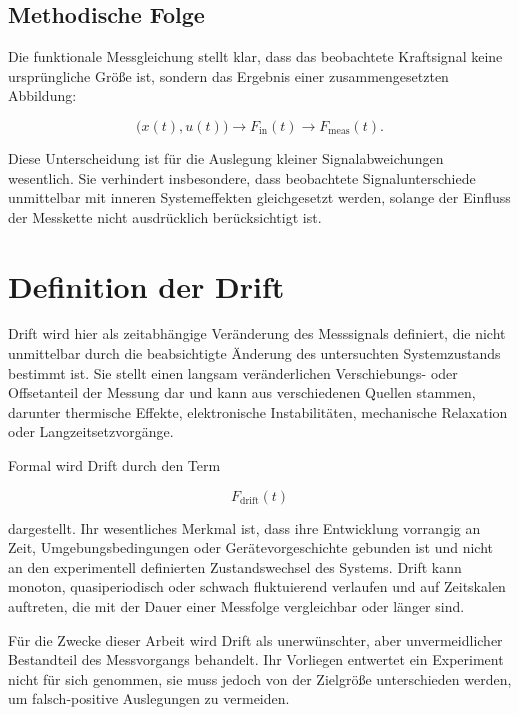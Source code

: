 \documentclass[12pt,a4paper]{report}
\begin{document}
\subsection{Methodische Folge}

Die funktionale Messgleichung stellt klar, dass das beobachtete
Kraftsignal keine ursprüngliche Größe ist, sondern das Ergebnis einer
zusammengesetzten Abbildung:

\begin{equation}
\bigl(x(t), u(t)\bigr) \rightarrow F_{\mathrm{in}}(t) \rightarrow F_{\mathrm{meas}}(t).
\label{eq:kette}
\end{equation}

Diese Unterscheidung ist für die Auslegung kleiner Signalabweichungen
wesentlich. Sie verhindert insbesondere, dass beobachtete
Signalunterschiede unmittelbar mit inneren Systemeffekten gleichgesetzt
werden, solange der Einfluss der Messkette nicht ausdrücklich
berücksichtigt ist.

\section{Definition der Drift}

Drift wird hier als zeitabhängige Veränderung des Messsignals definiert,
die nicht unmittelbar durch die beabsichtigte Änderung des untersuchten
Systemzustands bestimmt ist. Sie stellt einen langsam veränderlichen
Verschiebungs- oder Offsetanteil der Messung dar und kann aus
verschiedenen Quellen stammen, darunter thermische Effekte, elektronische
Instabilitäten, mechanische Relaxation oder Langzeitsetzvorgänge.

Formal wird Drift durch den Term

\begin{equation}
F_{\text{drift}}(t)
\end{equation}

dargestellt. Ihr wesentliches Merkmal ist, dass ihre Entwicklung
vorrangig an Zeit, Umgebungsbedingungen oder Gerätevorgeschichte gebunden
ist und nicht an den experimentell definierten Zustandswechsel des
Systems. Drift kann monoton, quasiperiodisch oder schwach fluktuierend
verlaufen und auf Zeitskalen auftreten, die mit der Dauer einer Messfolge
vergleichbar oder länger sind.

Für die Zwecke dieser Arbeit wird Drift als unerwünschter, aber
unvermeidlicher Bestandteil des Messvorgangs behandelt. Ihr Vorliegen
entwertet ein Experiment nicht für sich genommen, sie muss jedoch von der
Zielgröße unterschieden werden, um falsch-positive Auslegungen zu
vermeiden.
\end{document}
